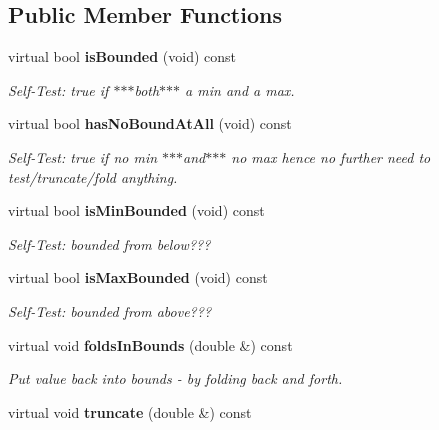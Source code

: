\subsection*{Public Member Functions}
\begin{CompactItemize}
\item 
virtual bool {\bf is\-Bounded} (void) const \label{classeo_int_no_bounds_a1}

\begin{CompactList}\small\item\em Self-Test: true if $\ast$$\ast$$\ast$both$\ast$$\ast$$\ast$ a min and a max. \item\end{CompactList}\item 
virtual bool {\bf has\-No\-Bound\-At\-All} (void) const \label{classeo_int_no_bounds_a2}

\begin{CompactList}\small\item\em Self-Test: true if no min $\ast$$\ast$$\ast$and$\ast$$\ast$$\ast$ no max hence no further need to test/truncate/fold anything. \item\end{CompactList}\item 
virtual bool {\bf is\-Min\-Bounded} (void) const \label{classeo_int_no_bounds_a3}

\begin{CompactList}\small\item\em Self-Test: bounded from below??? \item\end{CompactList}\item 
virtual bool {\bf is\-Max\-Bounded} (void) const \label{classeo_int_no_bounds_a4}

\begin{CompactList}\small\item\em Self-Test: bounded from above??? \item\end{CompactList}\item 
virtual void {\bf folds\-In\-Bounds} (double \&) const \label{classeo_int_no_bounds_a5}

\begin{CompactList}\small\item\em Put value back into bounds - by folding back and forth. \item\end{CompactList}\item 
virtual void {\bf truncate} (double \&) const \label{classeo_int_no_bounds_a6}


\end{CompactItemize}
